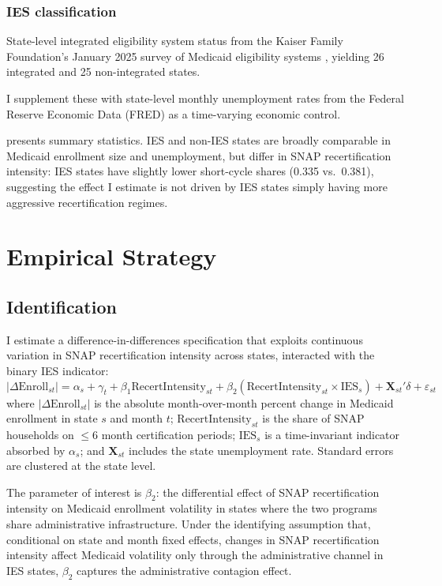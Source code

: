 \documentclass[12pt]{article}
\begin{document}
\subsubsection*{IES classification} State-level integrated eligibility system status from the Kaiser Family Foundation's January 2025 survey of Medicaid eligibility systems \citep{kff2025}, yielding 26 integrated and 25 non-integrated states.

I supplement these with state-level monthly unemployment rates from the Federal Reserve Economic Data (FRED) as a time-varying economic control.



 presents summary statistics. IES and non-IES states are broadly comparable in Medicaid enrollment size and unemployment, but differ in SNAP recertification intensity: IES states have slightly lower short-cycle shares (0.335 vs.\ 0.381), suggesting the effect I estimate is not driven by IES states simply having more aggressive recertification regimes.


\section{Empirical Strategy}

\subsection{Identification}

I estimate a difference-in-differences specification that exploits continuous variation in SNAP recertification intensity across states, interacted with the binary IES indicator:
\begin{equation}
\label{eq:main}
|{\Delta\text{Enroll}_{st}}| = \alpha_s + \gamma_t + \beta_1 \text{RecertIntensity}_{st} + \beta_2 (\text{RecertIntensity}_{st} \times \text{IES}_s) + \mathbf{X}_{st}'\delta + \varepsilon_{st}
\end{equation}
where $|{\Delta\text{Enroll}_{st}}|$ is the absolute month-over-month percent change in Medicaid enrollment in state $s$ and month $t$; $\text{RecertIntensity}_{st}$ is the share of SNAP households on $\leq$6 month certification periods; $\text{IES}_s$ is a time-invariant indicator absorbed by $\alpha_s$; and $\mathbf{X}_{st}$ includes the state unemployment rate. Standard errors are clustered at the state level.

The parameter of interest is $\beta_2$: the differential effect of SNAP recertification intensity on Medicaid enrollment volatility in states where the two programs share administrative infrastructure. Under the identifying assumption that, conditional on state and month fixed effects, changes in SNAP recertification intensity affect Medicaid volatility only through the administrative channel in IES states, $\beta_2$ captures the administrative contagion effect.
\end{document}
